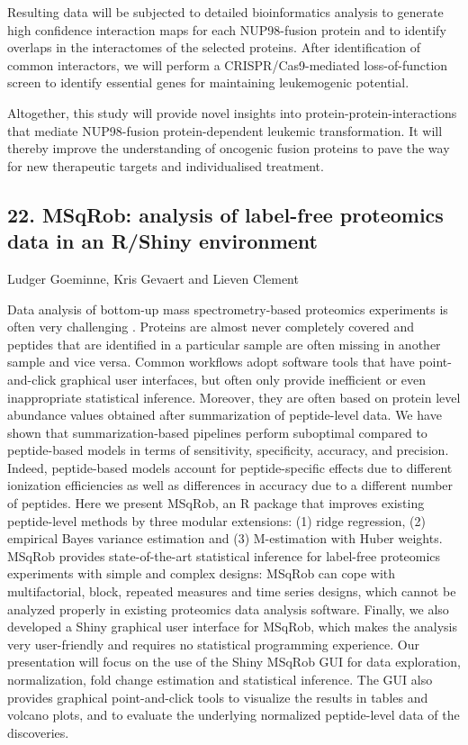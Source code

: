 Resulting data will be subjected to detailed bioinformatics analysis to generate high confidence interaction maps for each NUP98-fusion protein and to identify overlaps in the interactomes of the selected proteins. After identification of common interactors, we will perform a CRISPR/Cas9-mediated loss-of-function screen to identify essential genes for maintaining leukemogenic potential.

Altogether, this study will provide novel insights into protein-protein-interactions that mediate NUP98-fusion protein-dependent leukemic transformation. It will thereby improve the understanding of oncogenic fusion proteins to pave the way for new therapeutic targets and individualised treatment.

\subsection*{\color{eubicRed} 22. MSqRob: analysis of label-free proteomics data in an R/Shiny environment}
{\color{eubicGray}Ludger Goeminne, Kris Gevaert and Lieven Clement}

Data analysis of bottom-up mass spectrometry-based proteomics experiments is often very challenging . Proteins are almost never completely covered and peptides that are identified in a particular sample are often missing in another sample and vice versa. Common workflows adopt software tools that have point-and-click graphical user interfaces, but often only provide inefficient or even inappropriate statistical inference. Moreover, they are often based on protein level abundance values obtained after summarization of peptide-level data. We have shown that summarization-based pipelines perform suboptimal compared to peptide-based models in terms of sensitivity, specificity, accuracy, and precision. Indeed, peptide-based models account for peptide-specific effects due to different ionization efficiencies as well as differences in accuracy due to a different number of peptides. Here we present MSqRob, an R package that improves existing peptide-level methods by three modular extensions: (1) ridge regression, (2) empirical Bayes variance estimation and (3) M-estimation with Huber weights. MSqRob provides state-of-the-art statistical inference for label-free proteomics experiments with simple and complex designs: MSqRob can cope with multifactorial, block, repeated measures and time series designs, which cannot be analyzed properly in existing proteomics data analysis software. Finally, we also developed a Shiny graphical user interface for MSqRob, which makes the analysis very user-friendly and requires no statistical programming experience. Our presentation will focus on the use of the Shiny MSqRob GUI for data exploration, normalization, fold change estimation and statistical inference. The GUI also provides graphical point-and-click tools to visualize the results in tables and volcano plots, and to evaluate the underlying normalized peptide-level data of the discoveries.

